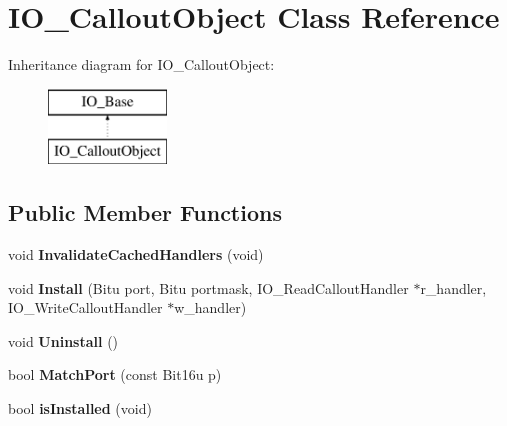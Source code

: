 \hypertarget{classIO__CalloutObject}{\section{I\-O\-\_\-\-Callout\-Object Class Reference}
\label{classIO__CalloutObject}
}
Inheritance diagram for I\-O\-\_\-\-Callout\-Object\-:\begin{figure}[H]
\begin{center}
\leavevmode
\includegraphics[height=2.000000cm]{classIO__CalloutObject}
\end{center}
\end{figure}
\subsection*{Public Member Functions}
\begin{DoxyCompactItemize}
\item 
\hypertarget{classIO__CalloutObject_a8de59c69976d87f15ceb49fbc4f7f5a2}{void {\bfseries Invalidate\-Cached\-Handlers} (void)}\label{classIO__CalloutObject_a8de59c69976d87f15ceb49fbc4f7f5a2}

\item 
\hypertarget{classIO__CalloutObject_abdefd68f6a3ec22b241b403ba56bbd38}{void {\bfseries Install} (Bitu port, Bitu portmask, I\-O\-\_\-\-Read\-Callout\-Handler $\ast$r\-\_\-handler, I\-O\-\_\-\-Write\-Callout\-Handler $\ast$w\-\_\-handler)}\label{classIO__CalloutObject_abdefd68f6a3ec22b241b403ba56bbd38}

\item 
\hypertarget{classIO__CalloutObject_a60da5d205541dd1cac03348b7ae1b48a}{void {\bfseries Uninstall} ()}\label{classIO__CalloutObject_a60da5d205541dd1cac03348b7ae1b48a}

\item 
\hypertarget{classIO__CalloutObject_afe0c0d7d82a33b67320a69a95adca097}{bool {\bfseries Match\-Port} (const Bit16u p)}\label{classIO__CalloutObject_afe0c0d7d82a33b67320a69a95adca097}

\item 
\hypertarget{classIO__CalloutObject_a85a2442019672fb65af84ecd680918c8}{bool {\bfseries is\-Installed} (void)}\label{classIO__CalloutObject_a85a2442019672fb65af84ecd680918c8}

\end{DoxyCompactItemize}

